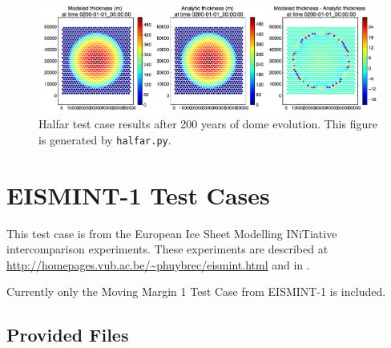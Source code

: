 \begin{figure}[H!]
	\centering
	\includegraphics[width=16.4cm]{landice/figures/halfar.png}
	\caption{Halfar test case results after 200 years of dome evolution. This figure is generated by \texttt{halfar.py}.}
	\label{fig:halfarresults}
\end{figure}


\FloatBarrier

\section{EISMINT-1 Test Cases}
\label{sec:eismint_description}
This test case is from the European Ice Sheet Modelling INiTiative intercomparison experiments.  These experiments are described at \url{http://homepages.vub.ac.be/~phuybrec/eismint.html} and in \citet{Huybrechts1996}.

Currently only the Moving Margin 1 Test Case from EISMINT-1 is included.


\subsection{Provided Files}
\label{subsec:eismint_files}


